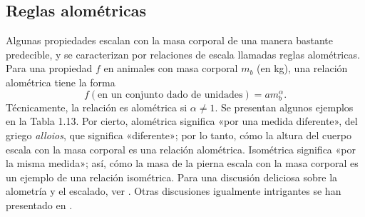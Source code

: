 \documentclass[12pt]{book}
\begin{document}
\subsection{Reglas alométricas}

Algunas propiedades escalan con la masa corporal de una manera bastante predecible, y se caracterizan por relaciones de escala llamadas reglas alométricas. Para una propiedad $f$ en animales con masa corporal $m_b$ (en kg), una relación alométrica tiene la forma
\begin{equation}
f (\text{en un conjunto dado de unidades}) = a m_b^\alpha.
\label{eq:1.1}
\end{equation}
Técnicamente, la relación es alométrica si $\alpha \neq 1$. Se presentan algunos ejemplos en la Tabla 1.13. Por cierto, alométrica significa «por una medida diferente», del griego \textit{alloios}, que significa «diferente»; por lo tanto, cómo la altura del cuerpo escala con la masa corporal es una relación alométrica. Isométrica significa «por la misma medida»; así, cómo la masa de la pierna escala con la masa corporal es un ejemplo de una relación isométrica. Para una discusión deliciosa sobre la alometría y el escalado, ver \cite{23}. Otras discusiones igualmente intrigantes se han presentado en \cite{2, 6, 7, 22, 24, 30, 33, 34}.
\end{document}

